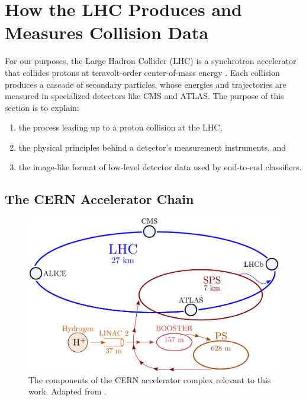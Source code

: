 \documentclass[11pt, a4paper]{article}
\begin{document}
\section{How the LHC Produces and Measures Collision Data}
For our purposes, the Large Hadron Collider (LHC) is a synchrotron accelerator that collides protons at teravolt-order center-of-mass energy \cite{lhc}.
Each collision produces a cascade of secondary particles, whose energies and trajectories are measured in specialized detectors like CMS and ATLAS.
The purpose of this section is to explain:
\begin{enumerate}

    \item the process leading up to a proton collision at the LHC,

    \item the physical principles behind a detector's measurement instruments, and

    \item the image-like format of low-level detector data used by end-to-end classifiers. %


\end{enumerate}

\subsection{The CERN Accelerator Chain}

\begin{figure}[htb!]
    \centering
    \includegraphics[width=0.75\linewidth]{vector/cern-complex.pdf}
    \caption{The components of the CERN accelerator complex relevant to this work.
    Adapted from \cite{image-cern-complex}.}
    \label{fig:cern-complex}
\end{figure}
\end{document}
